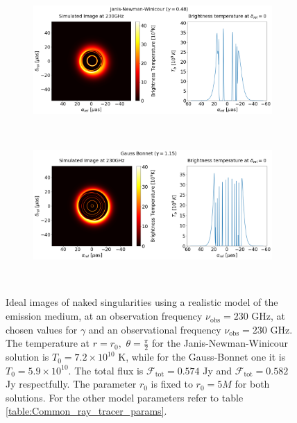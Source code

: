 \documentclass[12pt]{article}
\numberwithin{equation}{section}
\numberwithin{figure}{section}
\begin{document}
	\begin{figure}[h!]
		\centering
		\begin{subfigure}{12cm}
			\hspace{-0cm}
			\includegraphics[scale = 0.25]{Section_8_Observing_Horizonless_Objects/Ray_tracer_plot_230_JNW.png}
		\end{subfigure}\\
		\begin{subfigure}{12cm}
			\hspace{-0cm}
			\includegraphics[scale = 0.25]{Section_8_Observing_Horizonless_Objects/Ray_tracer_plot_230_GB.png}
		\end{subfigure}\\
		\label{Naked_Singularity_Ray_tracer_230}
		\caption[Ideal images of naked singularities using a realistic model of the emission medium, at an observation frequency $\nu_\text{obs} = 230$ GHz.]{\small Ideal images of naked singularities using a realistic model of the emission medium, at an observation frequency $\nu_\text{obs} = 230$ GHz, at chosen values for $\gamma$ and an observational frequency $\nu_\text{obs} = 230$ GHz. The temperature at $r = r_0,\,\,\theta = \frac{\pi}{2}$ for the Janis-Newman-Winicour solution is $T_0 = 7.2\times10^{10}$ K, while for the Gauss-Bonnet one it is $T_0 = 5.9\times10^{10}$. The total flux is $\mathcal{F}_{\text{tot}} = 0.574$ Jy and $\mathcal{F}_{\text{tot}} = 0.582$ Jy respectfully. The parameter $r_0$ is fixed to $r_0 = 5M$ for both solutions. For the other model parameters refer to table \ref{table:Common_ray_tracer_params}.} 
	\end{figure}
	
\end{document}

